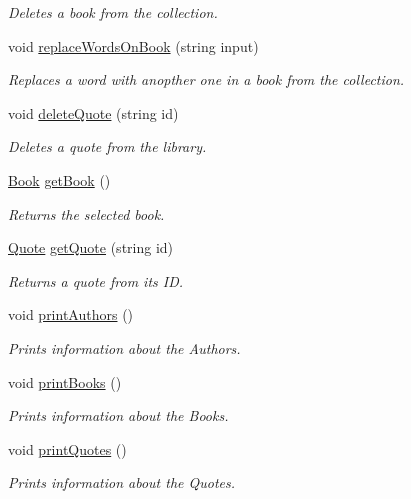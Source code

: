 \begin{DoxyCompactItemize}
\begin{DoxyCompactList}\small\item\em Deletes a book from the collection. \end{DoxyCompactList}\item 
void \hyperlink{class_library_a6d34fd014c959f8c13d9db2edf5bb99a}{replace\+Words\+On\+Book} (string input)
\begin{DoxyCompactList}\small\item\em Replaces a word with anopther one in a book from the collection. \end{DoxyCompactList}\item 
void \hyperlink{class_library_a705ee20f1edab1ebf274c9e2cbb4d7a3}{delete\+Quote} (string id)
\begin{DoxyCompactList}\small\item\em Deletes a quote from the library. \end{DoxyCompactList}\item 
\hyperlink{class_book}{Book} \hyperlink{class_library_a67ccad51c76c3abfb0d46fa533f46e03}{get\+Book} ()
\begin{DoxyCompactList}\small\item\em Returns the selected book. \end{DoxyCompactList}\item 
\hyperlink{class_quote}{Quote} \hyperlink{class_library_aba57d7dcf92c9da4c3d8a359ceba7e2b}{get\+Quote} (string id)
\begin{DoxyCompactList}\small\item\em Returns a quote from its I\+D. \end{DoxyCompactList}\item 
void \hyperlink{class_library_aba2ed0b3b1ee81565ca5b62f2ac5c924}{print\+Authors} ()
\begin{DoxyCompactList}\small\item\em Prints information about the Authors. \end{DoxyCompactList}\item 
void \hyperlink{class_library_a35220a3b5a4a6d9059cc4fc18ae4c0c3}{print\+Books} ()
\begin{DoxyCompactList}\small\item\em Prints information about the Books. \end{DoxyCompactList}\item 
void \hyperlink{class_library_a819acb04f4b8aea0547db50918b1c5fa}{print\+Quotes} ()
\begin{DoxyCompactList}\small\item\em Prints information about the Quotes. \end{DoxyCompactList}\item 

\end{DoxyCompactItemize}
